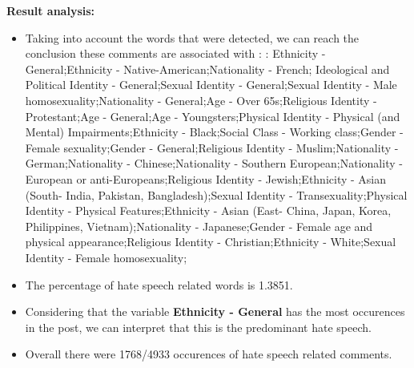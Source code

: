 \documentclass[11pt]{article}
\begin{document}
\textbf{\Large Result analysis:}

\begin{itemize}\item Taking into account the words that were detected, we can reach the conclusion these comments are associated with : : Ethnicity - General;Ethnicity - Native-American;Nationality - French; Ideological and Political Identity - General;Sexual Identity - General;Sexual Identity - Male homosexuality;Nationality - General;Age - Over 65s;Religious Identity - Protestant;Age - General;Age - Youngsters;Physical Identity - Physical (and Mental) Impairments;Ethnicity - Black;Social Class - Working class;Gender - Female sexuality;Gender - General;Religious Identity - Muslim;Nationality - German;Nationality - Chinese;Nationality - Southern European;Nationality - European or anti-Europeans;Religious Identity - Jewish;Ethnicity - Asian (South- India, Pakistan, Bangladesh);Sexual Identity - Transexuality;Physical Identity - Physical Features;Ethnicity - Asian (East- China, Japan, Korea, Philippines, Vietnam);Nationality - Japanese;Gender - Female age and physical appearance;Religious Identity - Christian;Ethnicity - White;Sexual Identity - Female homosexuality;%

\item The percentage of hate speech related words is 1.3851.

\item Considering that the variable \textbf{Ethnicity - General} has the most occurences in the post, we can interpret that this is the predominant hate speech.

\item Overall there were 1768/4933 occurences of hate speech related comments.\end{itemize}
\end{document}

